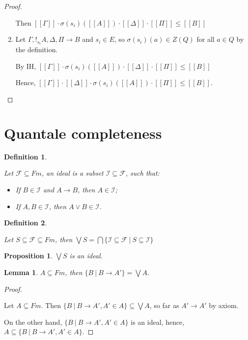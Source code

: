 \documentclass[a4paper]{article}
\newtheorem{prop}{Proposition}
\newtheorem{lemma}{Lemma}
\newtheorem{defin}{Definition}
\begin{document}
\begin{proof}
\begin{enumerate}
Then $[\![\Gamma]\!] \cdot \sigma(s_i)([\![A]\!]) \cdot [\![\Delta]\!] \cdot [\![\Pi]\!] \leq [\![B]\!]$

\item Let $\Gamma, !_{s_i} A, \Delta, \Pi \rightarrow B$ and $s_i \in E$, so $\sigma(s_i)(a) \in Z(Q)$ for all $a \in Q$ by the definition.

By IH, $[\![\Gamma]\!] \cdot \sigma(s_i)([\![A]\!]) \cdot [\![\Delta]\!] \cdot [\![\Pi]\!] \leq [\![B]\!]$

Hence, $[\![\Gamma]\!] \cdot [\![\Delta]\!] \cdot \sigma(s_i)([\![A]\!]) \cdot [\![\Pi]\!] \leq [\![B]\!]$.

\end{enumerate}

\end{proof}

\section{Quantale completeness}

\begin{defin}
$ $

  Let $\mathcal{F} \subseteq Fm$, an ideal is a subset $\mathcal{I} \subseteq \mathcal{F}$, such that:

\begin{itemize}
  \item If $B \in \mathcal{I}$ and $A \rightarrow B$, then $A \in \mathcal{I}$;
  \item If $A, B \in \mathcal{I}$, then $A \lor B \in \mathcal{I}$.
\end{itemize}
\end{defin}

\begin{defin}
$ $

  Let $S \subseteq \mathcal{F} \subseteq Fm$,
  then $\bigvee S = \bigcap \{ \mathcal{I} \subseteq \mathcal{F} \: | \: S \subseteq \mathcal{I} \}$
\end{defin}

\begin{prop}
  $\bigvee S$ is an ideal.
\end{prop}

\begin{lemma}
  $A \subseteq Fm$, then $\{ B \: | \: B \rightarrow A' \} = \bigvee A$.
\end{lemma}

\begin{proof}
$ $

Let $A \subseteq Fm$. Then $\{ B \: | \: B \rightarrow A', A' \in A \} \subseteq \bigvee A$, so far as $A' \rightarrow A'$ by axiom.

On the other hand, $\{ B \: | \: B \rightarrow A', A' \in A \}$ is an ideal, hence, $A \subseteq \{ B \: | \: B \rightarrow A', A' \in A \}$.
\end{proof}
\end{document}

